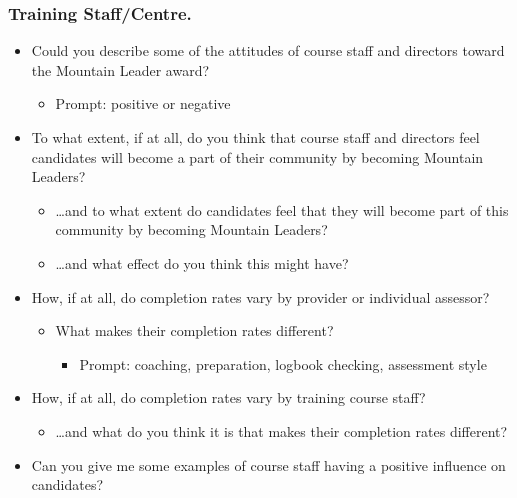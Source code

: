 \documentclass[
  12pt,
  a4paper,
]{book}
\providecommand{\tightlist}{%
  \setlength{\itemsep}{0pt}\setlength{\parskip}{0pt}}
\begin{document}
\hypertarget{training-staffcentre.}{%
\subsubsection{Training Staff/Centre.}\label{training-staffcentre.}}

\begin{itemize}
\tightlist
\item
  Could you describe some of the attitudes of course staff and directors toward the Mountain Leader award?

  \begin{itemize}
  \tightlist
  \item
    Prompt: positive or negative
  \end{itemize}
\item
  To what extent, if at all, do you think that course staff and directors feel candidates will become a part of their community by becoming Mountain Leaders?

  \begin{itemize}
  \tightlist
  \item
    \ldots and to what extent do candidates feel that they will become part of this community by becoming Mountain Leaders?
  \item
    \ldots and what effect do you think this might have?
  \end{itemize}
\item
  How, if at all, do completion rates vary by provider or individual assessor?

  \begin{itemize}
  \tightlist
  \item
    What makes their completion rates different?

    \begin{itemize}
    \tightlist
    \item
      Prompt: coaching, preparation, logbook checking, assessment style
    \end{itemize}
  \end{itemize}
\item
  How, if at all, do completion rates vary by training course staff?

  \begin{itemize}
  \tightlist
  \item
    \ldots and what do you think it is that makes their completion rates different?
  \end{itemize}
\item
  Can you give me some examples of course staff having a positive influence on candidates?


\end{itemize}
\end{document}
